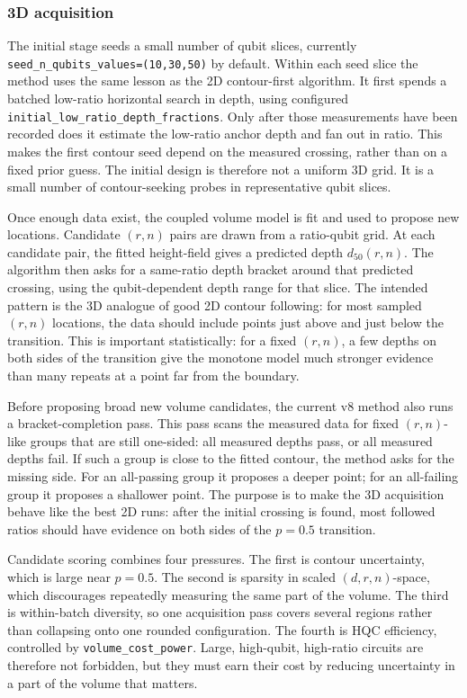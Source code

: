 \subsubsection{3D acquisition}

The initial stage seeds a small number of qubit slices, currently
\texttt{seed\_n\_qubits\_values=(10,30,50)} by default.  Within each seed slice
the method uses the same lesson as the 2D contour-first algorithm.  It first
spends a batched low-ratio horizontal search in depth, using configured
\texttt{initial\_low\_ratio\_depth\_fractions}.  Only after those measurements
have been recorded does it estimate the low-ratio anchor depth and fan out in
ratio.  This makes the first contour seed depend on the measured crossing,
rather than on a fixed prior guess.  The initial design is therefore not a
uniform 3D grid.  It is a small number of contour-seeking probes in
representative qubit slices.

Once enough data exist, the coupled volume model is fit and used to propose new
locations.  Candidate \((r,n)\) pairs are drawn from a ratio-qubit grid.  At
each candidate pair, the fitted height-field gives a predicted depth
\(d_{50}(r,n)\).  The algorithm then asks for a same-ratio depth bracket around
that predicted crossing, using the qubit-dependent depth range for that slice.
The intended pattern is the 3D analogue of good 2D contour following: for most
sampled \((r,n)\) locations, the data should include points just above and just
below the transition.  This is important statistically: for a fixed \((r,n)\),
a few depths on both sides of the transition give the monotone model much
stronger evidence than many repeats at a point far from the boundary.

Before proposing broad new volume candidates, the current v8 method also runs a
bracket-completion pass.  This pass scans the measured data for fixed
\((r,n)\)-like groups that are still one-sided: all measured depths pass, or all
measured depths fail.  If such a group is close to the fitted contour, the
method asks for the missing side.  For an all-passing group it proposes a
deeper point; for an all-failing group it proposes a shallower point.  The
purpose is to make the 3D acquisition behave like the best 2D runs: after the
initial crossing is found, most followed ratios should have evidence on both
sides of the \(p=0.5\) transition.

Candidate scoring combines four pressures.  The first is contour uncertainty,
which is large near \(p=0.5\).  The second is sparsity in scaled
\((d,r,n)\)-space, which discourages repeatedly measuring the same part of the
volume.  The third is within-batch diversity, so one acquisition pass covers
several regions rather than collapsing onto one rounded configuration.  The
fourth is HQC efficiency, controlled by \texttt{volume\_cost\_power}.  Large,
high-qubit, high-ratio circuits are therefore not forbidden, but they must earn
their cost by reducing uncertainty in a part of the volume that matters.

